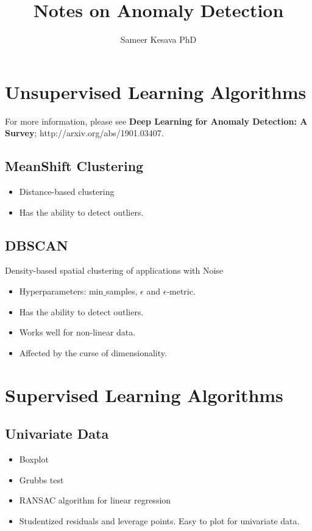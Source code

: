\documentclass[a4paper, 12pt]{report}
\begin{document}
\title{Notes on Anomaly Detection}
\author{Sameer Kesava PhD}
\date{} %
\maketitle

\tableofcontents
\newpage





\chapter{Unsupervised Learning Algorithms}
For more information, please see \textbf{Deep Learning for Anomaly Detection: A Survey}; http://arxiv.org/abs/1901.03407. 
\section{MeanShift Clustering}
\begin{itemize}
\item Distance-based clustering
\item Has the ability to detect outliers.
\end{itemize}

\section{DBSCAN}
Density-based spatial clustering of applications with Noise
\begin{itemize}
\item Hyperparameters: min$\_$samples, $\epsilon$ and $\epsilon$-metric.
\item Has the ability to detect outliers.
\item Works well for non-linear data.
\item Affected by the curse of dimensionality.
\end{itemize}


\chapter{Supervised Learning Algorithms}

\section{Univariate Data}
\begin{itemize}
\item Boxplot
\item Grubbs test
\item RANSAC algorithm for linear regression
\item Studentized residuals and leverage points. Easy to plot for univariate data.
\end{itemize}
\end{document}
